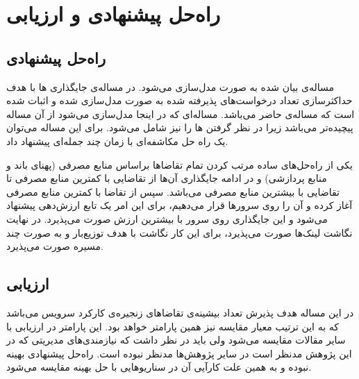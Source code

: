 \chapter{راه‌حل پیشنهادی و ارزیابی}

\section{راه‌حل پیشنهادی}

مساله‌ی بیان شده به صورت 
مدل‌سازی می‌شود.
در \cite{Eramo2016}
مساله‌ی جایگذاری ها با هدف حداکثرسازی تعداد درخواست‌های پذیرفته شده
به صورت  مدل‌سازی شده و اثبات شده است که مساله‌ی حاضر  می‌باشد.
مساله‌ای که در اینجا مدل‌سازی می‌شود از آن مساله پیچیده‌تر می‌باشد زیرا در نظر گرفتن ها را نیز شامل می‌شود.
برای این مساله می‌توان
یک راه حل مکاشفه‌ای با زمان چند جمله‌ای
پیشنهاد داد.

یکی از راه‌حل‌های ساده مرتب کردن تمام تقاضاها براساس منابع مصرفی (پهنای باند و منابع پردازشی)
و در ادامه جایگذاری آن‌ها از تقاضایی با کمترین منابع مصرفی تا تقاضایی با بیشترین منابع مصرفی می‌باشد.
سپس از تقاضا با کمترین منابع مصرفی آغاز کرده و آن را روی سرورها قرار می‌دهیم، برای این امر یک تابع ارزش‌دهی پیشنهاد می‌شود
و این جایگذاری روی سرور با بیشترین ارزش صورت می‌پذیرد.
در نهایت نگاشت لینک‌ها صورت می‌پذیرد، برای این کار نگاشت با هدف توزیع‌بار و به صورت چند مسیره صورت می‌پذیرد.

\section{ارزیابی}

در این مساله هدف پذیرش تعداد بیشینه‌ی تقاضاهای زنجیره‌ی کارکرد سرویس می‌باشد که به این ترتیب معیار مقایسه نیز همین پارامتر خواهد بود. این پارامتر در ارزیابی با سایر مقالات مقایسه می‌شود ولی باید در نظر داشت که نیازمندی‌های مدیریتی که در این پژوهش مدنظر است در سایر پژوهش‌ها مدنظر نبوده است.
راه‌حل پیشنهادی بهینه نبوده و به همین علت کارآیی آن در سناریوهایی با حل بهینه مقایسه می‌شود.